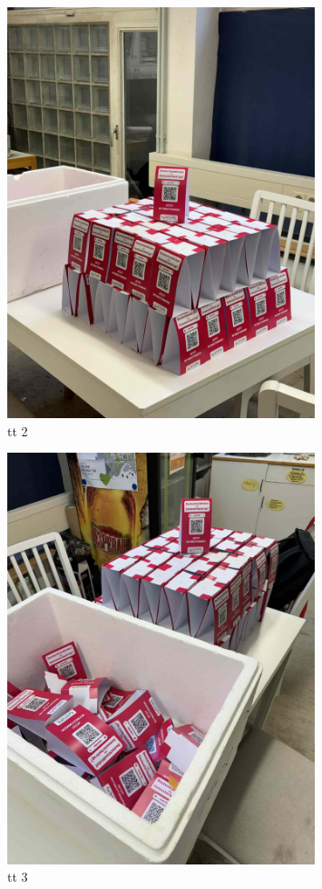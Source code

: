 \begin{multicols}{3}
\begin{figure}[H]
        \includegraphics[width=0.8\textwidth]{Content/Images/tt_02.jpg}
        \caption{\gls{tt} 2}
        \label{fig:table-tent}
    \end{figure}
    \columnbreak
    \begin{figure}[H]
        \vspace{0.3\textwidth}
        \includegraphics[width=0.8\textwidth]{Content/Images/tt_03.jpg}
        \caption{\gls{tt} 3}
        \label{fig:table-tent}
    \end{figure}
\end{multicols}

